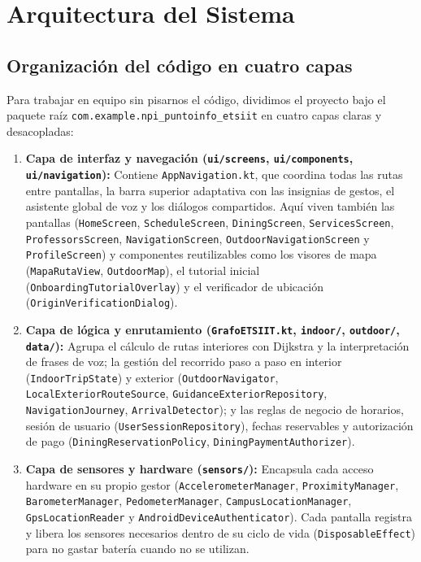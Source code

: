 \documentclass[11pt,a4paper]{article}
\begin{document}
\section{Arquitectura del Sistema}

\subsection{Organización del código en cuatro capas}
Para trabajar en equipo sin pisarnos el código, dividimos el proyecto bajo el paquete raíz \texttt{com.example.npi\_puntoinfo\_etsiit} en cuatro capas claras y desacopladas:

\begin{enumerate}[leftmargin=1.8em]
    \item \textbf{Capa de interfaz y navegación (\texttt{ui/screens}, \texttt{ui/components}, \texttt{ui/navigation}):} Contiene \texttt{AppNavigation.kt}, que coordina todas las rutas entre pantallas, la barra superior adaptativa con las insignias de gestos, el asistente global de voz y los diálogos compartidos. Aquí viven también las pantallas (\texttt{HomeScreen}, \texttt{ScheduleScreen}, \texttt{DiningScreen}, \texttt{ServicesScreen}, \texttt{ProfessorsScreen}, \texttt{NavigationScreen}, \texttt{OutdoorNavigationScreen} y \texttt{ProfileScreen}) y componentes reutilizables como los visores de mapa (\texttt{MapaRutaView}, \texttt{OutdoorMap}), el tutorial inicial (\texttt{OnboardingTutorialOverlay}) y el verificador de ubicación (\texttt{OriginVerificationDialog}).
    \clearpage
    \item \textbf{Capa de lógica y enrutamiento (\texttt{GrafoETSIIT.kt}, \texttt{indoor/}, \texttt{outdoor/}, \texttt{data/}):} Agrupa el cálculo de rutas interiores con Dijkstra y la interpretación de frases de voz; la gestión del recorrido paso a paso en interior (\texttt{IndoorTripState}) y exterior (\texttt{OutdoorNavigator}, \texttt{LocalExteriorRouteSource}, \texttt{GuidanceExteriorRepository}, \texttt{NavigationJourney}, \texttt{ArrivalDetector}); y las reglas de negocio de horarios, sesión de usuario (\texttt{UserSessionRepository}), fechas reservables y autorización de pago (\texttt{DiningReservationPolicy}, \texttt{DiningPaymentAuthorizer}).
    \item \textbf{Capa de sensores y hardware (\texttt{sensors/}):} Encapsula cada acceso hardware en su propio gestor (\texttt{AccelerometerManager}, \texttt{ProximityManager}, \texttt{BarometerManager}, \texttt{PedometerManager}, \texttt{CampusLocationManager}, \texttt{GpsLocationReader} y \texttt{AndroidDeviceAuthenticator}). Cada pantalla registra y libera los sensores necesarios dentro de su ciclo de vida (\texttt{DisposableEffect}) para no gastar batería cuando no se utilizan.

\end{enumerate}
\end{document}
